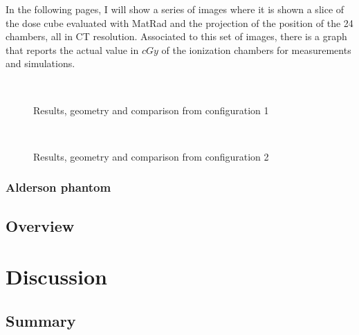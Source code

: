 \documentclass[12pt, a4paper, twoside]{book}
\begin{document}
In the following pages, I will show a series of images where it is shown a slice of the dose cube evaluated with MatRad and the projection of the position of the 24 chambers, all in CT resolution. Associated to this set of images, there is a graph that reports the actual value in $cGy$ of the ionization chambers for measurements and simulations.
\newpage
\begin{figure}[h!]
\centering
{} \quad
{} \\
 \quad
\caption{Results, geometry and comparison from configuration 1}
\label{fig:pos1}
\end{figure}

\newpage
\begin{figure}[h!]
\centering
{} \quad
{} \\
 \quad
\caption{Results, geometry and comparison from configuration 2}
\label{fig:pos2}
\end{figure}

\subsection{Alderson phantom}

\section{Overview} %


\chapter{Discussion} %

\section{Summary}
\end{document}

